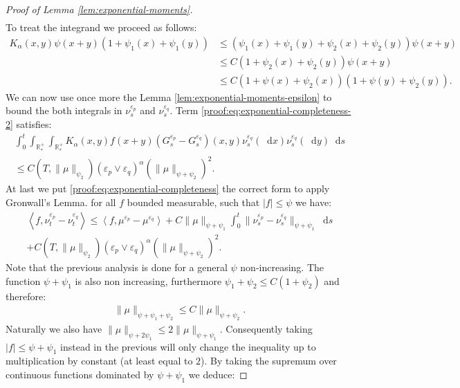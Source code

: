 \documentclass[11pt,a4paper]{article}
\newcommand{\RRP}{\mathbb{R}^+_*}
\newcommand{\brac}[1]{\left\langle#1\right\rangle}
\newcommand{\dd}{\mathop{}\!\mathrm{d}}
\begin{document}
\begin{proof}[Proof of Lemma \ref{lem:exponential-moments}]
\begin{multline*}
    \end{multline*}
    To treat the integrand we proceed as follows:
    \begin{align*}
        K_\alpha(x,y)\psi(x+y)\left(1 + \psi_1(x) + \psi_1(y) \right) 
        &\leq \left(\psi_1(x) + \psi_1(y) + \psi_2(x) + \psi_2(y)\right)\psi(x+y) \\
        &\leq C\left(1 + \psi_2(x) + \psi_2(y)\right)\psi(x+y) \\
        &\leq C\left(1 + \psi(x) + \psi_2(x)\right)\left(1 + \psi(y)+ \psi_2(y)\right).
    \end{align*}
    We can now use once more the Lemma \ref{lem:exponential-moments-epsilon} to bound the both integrals in $ \nu_s^{\varepsilon_p}$ and $\nu_s^{\varepsilon_q}$. Term \eqref{proof:eq:exponential-completeness-2} satisfies:
    \begin{align*}
        \int_0^t\int_{\RRP}\int_{\RRP}K_\alpha(x,y)f(x+y) (G^{\varepsilon_p}_s - G^{\varepsilon_q}_s)(x,y)\nu_s^{\varepsilon_q}(\dd x)\nu_s^{\varepsilon_q}(\dd y) \dd s \\
        \leq C\left(T,\|\mu\|_{\psi_2}\right)\left(\varepsilon_p \vee \varepsilon_q \right)^{\alpha} \left(\|\mu\|_{\psi + \psi_2}\right)^2.
    \end{align*}
    At last we put \eqref{proof:eq:exponential-completeness} the correct form to apply Gronwall's Lemma. for all $f$  bounded measurable, such that  $|f| \leq \psi$ we have:
    \begin{multline*}
        \brac{f,\nu_t^{\varepsilon_p}-\nu_t^{\varepsilon_q}} \leq  \brac{f,\mu^{\varepsilon_p} - \mu^{\varepsilon_q}} + C\|\mu\|_{\psi + \psi_1}\int_0^t \|\nu_s^{\varepsilon_p}-\nu_s^{\varepsilon_q}\|_{\psi + \psi_1}\dd s \\
        + C\left(T,\|\mu\|_{\psi_2}\right)\left(\varepsilon_p \vee \varepsilon_q \right)^{\alpha} \left(\|\mu\|_{\psi + \psi_2}\right)^2.
    \end{multline*}
    Note that the previous analysis is done for a general $\psi$ non-increasing. The function $\psi + \psi_1$ is also non increasing, furthermore $\psi_1 + \psi_2 \leq C(1 + \psi_2)$ and therefore:
    \begin{align*}
        \|\mu\|_{\psi + \psi_1 + \psi_2} \leq C\|\mu\|_{\psi + \psi_2}.
    \end{align*}
    Naturally we also have $\|\mu\|_{\psi + 2\psi_1} \leq 2 \|\mu\|_{\psi + \psi_1}$. Consequently taking $|f| \leq \psi + \psi_1$ instead in the previous will only change the inequality up to multiplication by constant (at least equal to $2$). By taking the supremum over continuous functions dominated by $\psi + \psi_1$ we deduce:

\end{proof}
\end{document}
